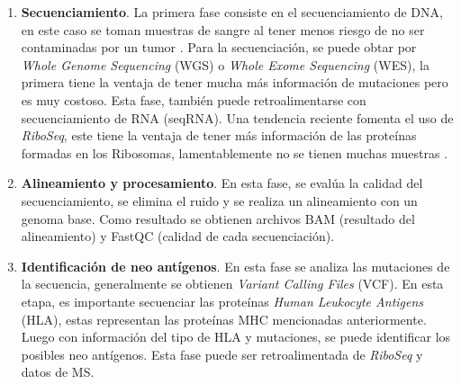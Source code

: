 \begin{enumerate}
	\item \textbf{Secuenciamiento}. La primera fase consiste en el secuenciamiento de DNA, en este caso se toman muestras de sangre al tener menos riesgo de no ser contaminadas por un tumor \citep{borden2022cancer}. Para la secuenciación, se puede obtar por \textit{Whole Genome Sequencing} (WGS) o \textit{Whole Exome Sequencing} (WES), la primera tiene la ventaja de tener mucha más información de mutaciones pero es muy costoso. Esta fase, también puede retroalimentarse con secuenciamiento de RNA (seqRNA). Una tendencia reciente fomenta el uso de \textit{RiboSeq}, este tiene la ventaja de tener más información de las proteínas formadas en los Ribosomas, lamentablemente no se tienen muchas muestras \citep{borden2022cancer}.
	
	\item \textbf{Alineamiento y procesamiento}. En esta fase, se evalúa la calidad del secuenciamiento, se elimina el ruido y se realiza un alineamiento con un genoma base. Como resultado se obtienen archivos BAM (resultado del alineamiento) y FastQC (calidad de cada secuenciación).
	
	\item \textbf{Identificación de neo antígenos}. En esta fase se analiza las mutaciones de la secuencia, generalmente se obtienen \textit{Variant Calling Files} (VCF). En esta etapa, es importante secuenciar las proteínas \textit{Human Leukocyte Antigens} (HLA), estas representan las proteínas MHC mencionadas anteriormente. Luego con información del tipo de HLA y mutaciones, se puede identificar los posibles neo antígenos. Esta fase puede ser retroalimentada de \textit{RiboSeq} y datos de MS.
	

\end{enumerate}

